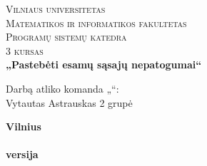 \begin{titlepage}

  \begin{center}

    \textsc{\Large Vilniaus universitetas\\
    Matematikos ir informatikos fakultetas\\
    Programų sistemų katedra\\
    3 kursas }\\[6.0cm]

    \textbf{ \Large „Pastebėti esamų sąsajų nepatogumai“ }\\[0.5cm]

    \begin{minipage}[]{0.8\textwidth}
      \begin{flushright}
        Darbą atliko komanda „\teamname“:\\
        Vytautas Astrauskas 2 grupė
      \end{flushright}
    \end{minipage}

    \vfill

    \textbf{\large  Vilnius \\ \the\year \\ \docversion{} versija }
  \end{center}
  
\end{titlepage}
